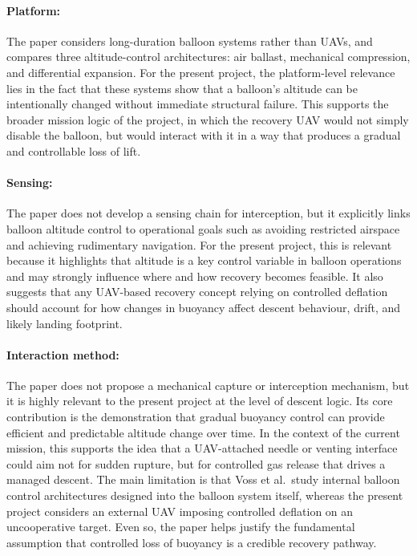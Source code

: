 \paragraph{Platform:} The paper considers long-duration balloon systems rather than UAVs, and compares three altitude-control architectures: air ballast, mechanical compression, and differential expansion. For the present project, the platform-level relevance lies in the fact that these systems show that a balloon’s altitude can be intentionally changed without immediate structural failure. This supports the broader mission logic of the project, in which the recovery UAV would not simply disable the balloon, but would interact with it in a way that produces a gradual and controllable loss of lift. \cite{Voss2005AltitudeControl} 

\paragraph{Sensing:} The paper does not develop a sensing chain for interception, but it explicitly links balloon altitude control to operational goals such as avoiding restricted airspace and achieving rudimentary navigation. For the present project, this is relevant because it highlights that altitude is a key control variable in balloon operations and may strongly influence where and how recovery becomes feasible. It also suggests that any UAV-based recovery concept relying on controlled deflation should account for how changes in buoyancy affect descent behaviour, drift, and likely landing footprint. \cite{Voss2005AltitudeControl}

\paragraph{Interaction method:} The paper does not propose a mechanical capture or interception mechanism, but it is highly relevant to the present project at the level of descent logic. Its core contribution is the demonstration that gradual buoyancy control can provide efficient and predictable altitude change over time. In the context of the current mission, this supports the idea that a UAV-attached needle or venting interface could aim not for sudden rupture, but for controlled gas release that drives a managed descent. The main limitation is that Voss et al.\ study internal balloon control architectures designed into the balloon system itself, whereas the present project considers an external UAV imposing controlled deflation on an uncooperative target. Even so, the paper helps justify the fundamental assumption that controlled loss of buoyancy is a credible recovery pathway. \cite{Voss2005AltitudeControl}



